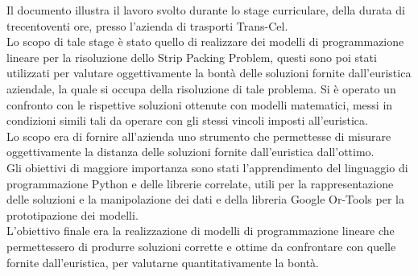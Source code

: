 
Il documento illustra il lavoro svolto durante lo stage curriculare, della durata di trecentoventi ore, presso l’azienda di trasporti Trans-Cel.\\
Lo scopo di tale stage è stato quello di realizzare dei modelli di programmazione lineare per la risoluzione dello Strip Packing Problem, questi sono poi stati utilizzati per valutare oggettivamente la bontà delle soluzioni fornite dall'euristica aziendale, la quale si occupa della risoluzione di tale problema.
Si è operato un confronto con le rispettive soluzioni ottenute con modelli matematici, messi in condizioni simili tali da operare con gli stessi vincoli imposti all'euristica.\\
Lo scopo era di fornire all'azienda uno strumento che permettesse di misurare oggettivamente la distanza delle soluzioni fornite dall'euristica dall'ottimo.\\
\newline
Gli obiettivi di maggiore importanza sono stati l'apprendimento del linguaggio di programmazione Python e delle librerie correlate, utili per la rappresentazione delle soluzioni e la manipolazione dei dati e della libreria Google Or-Tools per la prototipazione dei modelli.\\
L'obiettivo finale era la realizzazione di modelli di programmazione lineare che permettessero di produrre soluzioni corrette e ottime da confrontare con quelle fornite dall'euristica, per valutarne quantitativamente la bontà.